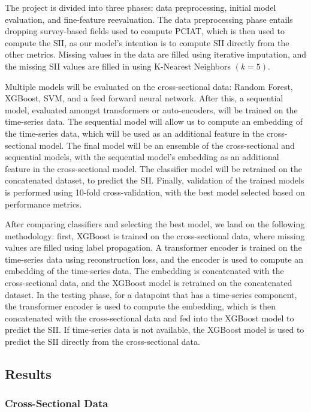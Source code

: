 \documentclass[12pt]{extarticle}
\begin{document}
  The project is divided into three phases: data preprocessing, initial model evaluation, and fine-feature reevaluation.
  The data preprocessing phase entails dropping survey-based fields used to compute PCIAT, which is then used to compute the SII, as our model's intention is to compute SII directly from the other metrics.
  Missing values in the data are filled using iterative imputation, and the missing SII values are filled in using K-Nearest Neighbors $(k=5)$.

  Multiple models will be evaluated on the cross-sectional data: Random Forest, XGBoost, SVM, and a feed forward neural network. After this, a sequential model, evaluated amongst transformers or auto-encoders, will be trained on the time-series data. 
  The sequential model will allow us to compute an embedding of the time-series data, which will be used as an additional feature in the cross-sectional model.
  The final model will be an ensemble of the cross-sectional and sequential models, with the sequential model's embedding as an additional feature in the cross-sectional model. 
  The classifier model will be retrained on the concatenated dataset, to predict the SII.
  Finally, validation of the trained models is performed using 10-fold cross-validation, with the best model selected based on performance metrics.

  After comparing classifiers and selecting the best model, we land on the following methodology: first, XGBoost is trained on the cross-sectional data, where missing values are filled using label propagation. A transformer encoder is trained on the time-series data using reconstruction loss, and the encoder is used to compute an embedding of the time-series data. The embedding is concatenated with the cross-sectional data, and the XGBoost model is retrained on the concatenated dataset. In the testing phase, for a datapoint that has a time-series component, the transformer encoder is used to compute the embedding, which is then concatenated with the cross-sectional data and fed into the XGBoost model to predict the SII. If time-series data is not available, the XGBoost model is used to predict the SII directly from the cross-sectional data.

  \subsection{Results} 
  \subsubsection{Cross-Sectional Data}
\end{document}
